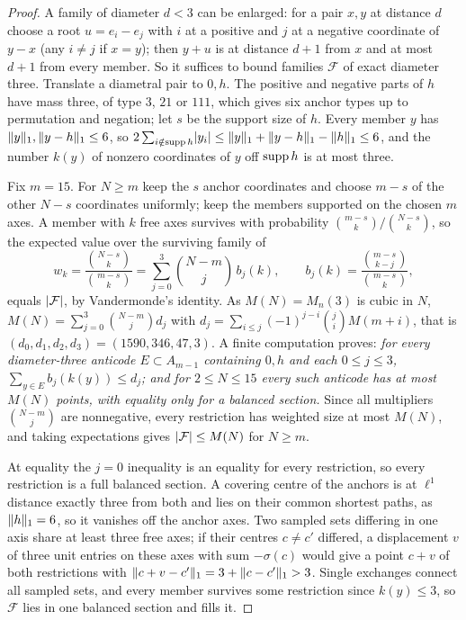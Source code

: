 \begin{proof}
A family of diameter $d<3$ can be enlarged: for a pair $x,y$ at distance $d$ choose a root
$u=e_i-e_j$ with $i$ at a positive and $j$ at a negative coordinate of $y-x$ (any $i\ne j$
if $x=y$); then $y+u$ is at distance $d+1$ from $x$ and at most $d+1$ from every member. So
it suffices to bound families $\mathcal F$ of exact diameter three. Translate a diametral
pair to $0,h$. The positive and negative parts of $h$ have mass three, of type $3$, $21$ or
$111$, which gives six anchor types up to permutation and negation; let $s$ be the support
size of $h$. Every member $y$ has $\lVert y\rVert_1,\lVert y-h\rVert_1\le6$, so
$2\sum_{i\notin\operatorname{supp} h}\lvert y_i\rvert\le\lVert y\rVert_1+\lVert y-h\rVert_1-\lVert h\rVert_1\le6$, and the number
$k(y)$ of nonzero coordinates of $y$ off $\operatorname{supp} h$ is at most three.

Fix $m=15$. For $N\ge m$ keep the $s$ anchor coordinates and choose $m-s$ of the other
$N-s$ coordinates uniformly; keep the members supported on the chosen $m$ axes. A member
with $k$ free axes survives with probability $\binom{m-s}k/\binom{N-s}k$, so the expected
value over the surviving family of
\[
 w_k=\frac{\binom{N-s}k}{\binom{m-s}k}=\sum_{j=0}^3\binom{N-m}j\,b_j(k),\qquad
 b_j(k)=\frac{\binom{m-s}{k-j}}{\binom{m-s}k},
\]
equals $\lvert\mathcal F\rvert$, by Vandermonde's identity. As $M(N)=M_n(3)$ is cubic in $N$,
$M(N)=\sum_{j=0}^3\binom{N-m}jd_j$ with $d_j=\sum_{i\le j}(-1)^{j-i}\binom jiM(m+i)$, that is
$(d_0,d_1,d_2,d_3)=(1590,346,47,3)$. A finite computation proves: \emph{for every
diameter-three anticode $E\subset A_{m-1}$ containing $0,h$ and each $0\le j\le3$,
$\sum_{y\in E}b_j(k(y))\le d_j$; and for $2\le N\le15$ every such anticode has at most
$M(N)$ points, with equality only for a balanced section.} Since all multipliers
$\binom{N-m}j$ are nonnegative, every restriction has weighted size at most $M(N)$, and
taking expectations gives $\lvert\mathcal F\rvert\le M(N)$ for $N\ge m$.

At equality the $j=0$ inequality is an equality for every restriction, so every
restriction is a full balanced section. A covering centre of the anchors is at $\ell^1$
distance exactly three from both and lies on their common shortest paths, as
$\lVert h\rVert_1=6$, so it vanishes off the anchor axes. Two sampled sets differing in one axis
share at least three free axes; if their centres $c\ne c'$ differed, a displacement $v$ of
three unit entries on these axes with sum $-\sigma(c)$ would give a point $c+v$ of both
restrictions with $\lVert c+v-c'\rVert_1=3+\lVert c-c'\rVert_1>3$. Single exchanges connect all sampled
sets, and every member survives some restriction since $k(y)\le3$, so $\mathcal F$ lies in
one balanced section and fills it.


\end{proof}
